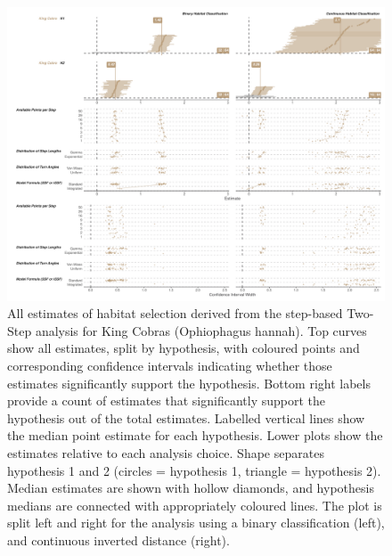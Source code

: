 \documentclass[10pt,a4paper]{article}
\begin{document}
\begin{figure}[h]
\includegraphics[width=1\linewidth]{../../figures/specCurve_King Cobra_twoStep} \caption{All estimates of habitat selection derived from the step-based Two-Step analysis for King Cobras (Ophiophagus hannah). Top curves show all estimates, split by hypothesis, with coloured points and corresponding confidence intervals indicating whether those estimates significantly support the hypothesis. Bottom right labels provide a count of estimates that significantly support the hypothesis out of the total estimates. Labelled vertical lines show the median point estimate for each hypothesis. Lower plots show the estimates relative to each analysis choice. Shape separates hypothesis 1 and 2 (circles = hypothesis 1, triangle = hypothesis 2). Median estimates are shown with hollow diamonds, and hypothesis medians are connected with appropriately coloured lines. The plot is split left and right for the analysis using a binary classification (left), and continuous inverted distance (right).}\label{fig:specCurveTwoStepOPHA}
\end{figure}
\end{document}
